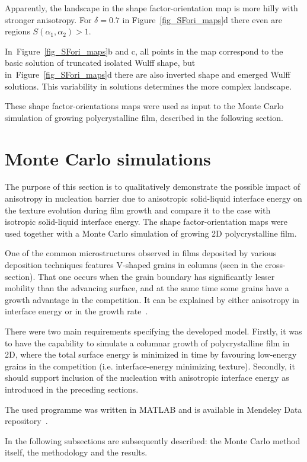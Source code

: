 Apparently, the landscape in the shape factor-orientation map is more hilly with stronger anisotropy. For $\delta=0.7$ in Figure~\ref{fig_SFori_maps}d there even are regions $S(\alpha_1,\alpha_2)>1$. 

In~Figure~\ref{fig_SFori_maps}b and c, all points in the map correspond to the basic solution of truncated isolated Wulff shape, but in~Figure~\ref{fig_SFori_maps}d there are also inverted shape and emerged Wulff solutions. This variability in solutions determines the more complex landscape.

These shape factor-orientations maps were used as input to the Monte Carlo simulation of growing polycrystalline film, described in the following section.

\section{Monte Carlo simulations}\label{sec_MC}
The purpose of this section is to qualitatively demonstrate the possible impact of anisotropy in nucleation barrier due to anisotropic solid-liquid interface energy on the texture evolution during film growth and compare it to the case with isotropic solid-liquid interface energy. The shape factor-orientation maps were used together with a Monte Carlo simulation of growing 2D polycrystalline film.

One of the common microstructures observed in films deposited by various deposition techniques features V-shaped grains in columns (seen in the cross-section). That one occurs when the grain boundary has significantly lesser mobility than the advancing surface, and at the same time some grains have a growth advantage in the competition. It can be explained by either anisotropy in interface energy or in the growth rate~\cite{Wendler2011}. 

There were two main requirements specifying the developed model. Firstly, it was to have the capability to simulate a columnar growth of polycrystalline film in 2D, where the total surface energy is minimized in time by favouring low-energy grains in the competition (i.e. interface-energy minimizing texture). Secondly, it should support inclusion of the nucleation with anisotropic interface energy as introduced in the preceding sections. 

The used programme was written in MATLAB and is available in Mendeley Data repository~\cite{Minar2023dataset}.

In the following subsections are subsequently described: the Monte Carlo method itself, the methodology and the results.

